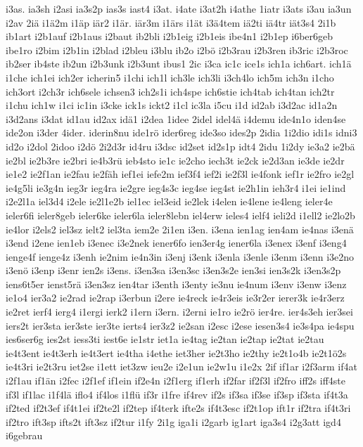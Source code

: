 {i3as.
ia3sh
i2asi
ia3s2p
ias3s
iast4
i3at.
i4ate
i3at2h
i4athe
1iatr
i3ats
i3au
ia3un
i2av
2iä
i1ä2m
i1äp
iär2
i1är.
iär3m
i1ärs
i1ät
i3ä4tem
iä2ti
iä4tr
iät3s4
2i1b
ib1art
i2b1auf
i2b1aus
i2baut
ib2bli
i2b1eig
i2b1eis
ibe4n1
i2b1ep
i6ber6geb
ibe1ro
i2bim
i2b1in
i2blad
i2bleu
i3blu
ib2o
i2bö
i2b3rau
i2b3ren
ib3ric
i2b3roc
ib2ser
ib4ste
ib2un
i2b3unk
i2b3unt
ibus1
2ic
i3ca
ic1c
ice1s
ich1a
ich6art.
ich1ä
i1che
ich1ei
ich2er
icherin5
i1chi
ich1l
ich3le
ich3li
i3ch4lo
ich5m
ich3n
i1cho
ich3ort
i2ch3r
ich6sele
ichsen3
ich2s1i
ich4spe
ich6stie
ich4tab
ich4tan
ich2tr
i1chu
ich1w
i1ci
ic1in
i3cke
ick1s
ickt2
i1cl
ic3la
i5cu
i1d
id2ab
i3d2ac
id1a2n
i3d2ans
i3dat
id1au
id2ax
idä1
i2dea
1idee
2idel
idel4ä
i4demu
ide4n1o
iden4se
ide2on
i3der
4ider.
iderin8nu
ide1rö
ider6reg
ide3so
ides2p
2idia
1i2dio
idi1s
idni3
id2o
i2dol
2idoo
i2dö
2i2d3r
id4ru
i3dsc
id2set
id2s1p
idt4
2idu
1i2dy
ie3a2
ie2bä
ie2bl
ie2b3re
ie2bri
ie4b3rü
ieb4sto
ie1c
ie2cho
iech3t
ie2ck
ie2d3an
ie3de
ie2dr
ie1e2
ie2f1an
ie2fau
ie2fäh
ief1ei
iefe2m
ief3f4
ief2i
ie2f3l
ie4fonk
ief1r
ie2fro
ie2gl
ie4g5li
ie3g4n
ieg3r
ieg4ra
ie2gre
ieg4s3c
ieg4se
ieg4st
ie2h1in
ieh3r4
i1ei
ie1ind
i2e2l1a
iel3d4
i2ele
ie2l1e2b
iel1ec
iel3eid
ie2lek
i4elen
ie4lene
ie4leng
ieler4e
ieler6fi
ieler8geb
ieler6ke
ieler6la
ieler8lebn
iel4erw
ieles4
ielf4
ieli2d
i1ell2
ie2lo2b
ie4lor
i2els2
iel3sz
ielt2
iel3ta
iem2e
2i1en
i3en.
i3ena
ien1ag
ien4am
ie4nas
i3enä
i3end
i2ene
ien1eb
i3enec
i3e2nek
iener6fo
ien3er4g
iener6la
i3enex
i3enf
i3eng4
ienge4f
ienge4z
i3enh
ie2nim
ie4n3in
i3enj
i3enk
i3enla
i3enle
i3enm
i3enn
i3e2no
i3enö
i3enp
i3enr
ien2s
i3ens.
i3en3sa
i3en3sc
i3en3s2e
ien3si
ien3s2k
i3en3s2p
iens6t5er
ienst5rä
i3en3sz
ien4tar
i3enth
i3enty
ie3nu
ie4num
i3env
i3enw
i3enz
ie1o4
ier3a2
ie2rad
ie2rap
i3erbun
i2ere
ie4reck
ie4r3eis
ie3r2er
ierer3k
ie4r3erz
ie2ret
ierf4
ierg4
i1ergi
ierk2
i1ern
i3ern.
i2erni
ie1ro
ie2rö
ier4re.
ier4s3eh
ier3sei
iers2t
ier3sta
ier3ste
ier3te
ierts4
ier3z2
ie2san
i2esc
i2ese
iesen3s4
ie3s4pa
ie4spu
ies6ser6g
ies2st
iess3ti
iest6e
ie1str
iet1a
ie4tag
ie2tan
ie2tap
ie2tat
ie2tau
ie4t3ent
ie4t3erh
ie4t3ert
ie4tha
i4ethe
iet3her
ie2t3ho
ie2thy
ie2t1o4b
ie2t1ö2s
ie4t3ri
ie2t3ru
iet2se
i1ett
iet3zw
ieu2e
i2e1un
ie2w1u
i1e2x
2if
if1ar
i2f3arm
if4at
i2f1au
if1än
i2fec
i2f1ef
if1ein
if2e4n
i2f1erg
if1erh
if2far
if2f3l
if2fro
iff2s
iff4ste
if3l
if1lac
i1f4lä
iflo4
if4los
i1flü
if3r
i1fre
if4rev
if2s
if3sa
if3se
if3sp
if3sta
if4t3a
if2ted
if2t3ef
if4t1ei
if2te2l
if2tep
if4terk
ifte2s
if4t3esc
if2t1op
ift1r
if2tra
if4t3ri
if2tro
ift3sp
ifts2t
ift3sz
if2tur
i1fy
2i1g
iga1i
i2garb
ig1art
iga3s4
i2g3att
igd4
i6gebrau
}
